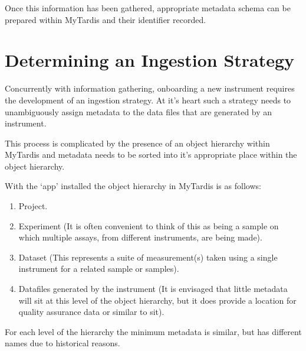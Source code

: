 \documentclass[letterpaper,10pt,english]{sphinxmanual}
\begin{document}
\sphinxAtStartPar
Once this information has been gathered, appropriate metadata schema can be prepared within MyTardis and their identifier recorded.


\section{Determining an Ingestion Strategy}
\label{\detokenize{index:determining-an-ingestion-strategy}}\label{\detokenize{index:ingestion-strat}}
\sphinxAtStartPar
Concurrently with information gathering, onboarding a new instrument requires the development of an ingestion strategy. At it’s heart such a strategy needs to unambiguously assign metadata to the data files that are generated by an instrument.

\sphinxAtStartPar
This process is complicated by the presence of an object hierarchy within MyTardis and metadata needs to be sorted into it’s appropriate place within the object hierarchy.

\sphinxAtStartPar
With the  ‘app’ installed the object hierarchy in MyTardis is as follows:
\begin{enumerate}
%
\item {}
\sphinxAtStartPar
Project.

\item {}
\sphinxAtStartPar
Experiment (It is often convenient to think of this as being a sample on which multiple assays, from different instruments, are being made).

\item {}
\sphinxAtStartPar
Dataset (This represents a suite of measurement(s) taken using a single instrument for a related sample or samples).

\item {}
\sphinxAtStartPar
Datafiles generated by the instrument (It is envisaged that little metadata will sit at this level of the object hierarchy, but it does provide a location for quality assurance data or similar to sit).

\end{enumerate}

\sphinxAtStartPar
For each level of the hierarchy the minimum metadata is similar, but has different names due to historical reasons.
\end{document}
